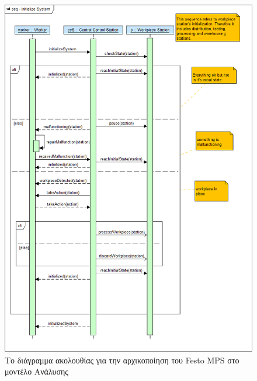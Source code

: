 \documentclass[a4paper,12pt,twoside]{report}
\begin{document}
{\begin{appendices}
			\begin{figure}[hp]
					\centering
					\includegraphics[scale=0.30]{AnalysisModel_seq-InitializeSystem.png}
					\caption{Το διάγραμμα ακολουθίας για την αρχικοποίηση του Festo MPS στο μοντέλο Ανάλυσης}
					\label{φωτ:Το διάγραμμα ακολουθίας για την αρχικοποίηση του Festo MPS στο μοντέλο Ανάλυσης}
			\end{figure}
			

\end{appendices}}
\end{document}
